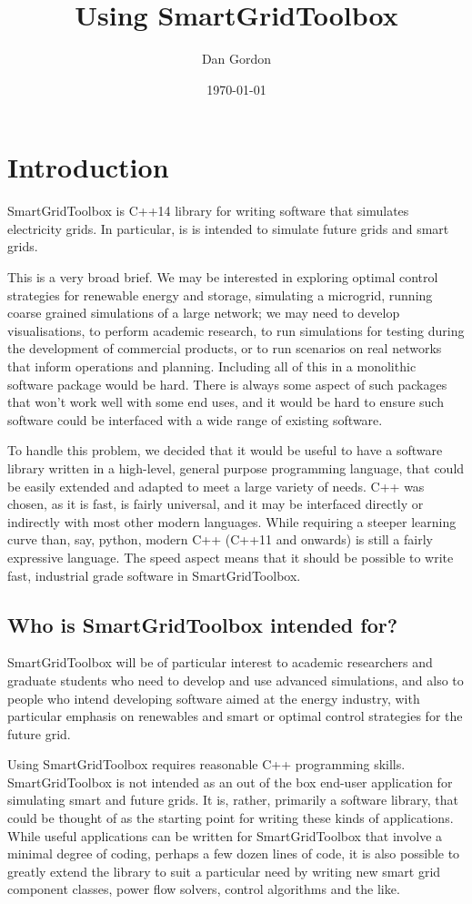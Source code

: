 \documentclass[10pt]{article}
\title{Using SmartGridToolbox}
\author{Dan Gordon}
\date{\today}
\begin{document}
\maketitle

\section{Introduction}
SmartGridToolbox is C++14 library for writing software that simulates electricity grids. In particular, is is intended to simulate future grids and smart grids.

This is a very broad brief. We may be interested in exploring optimal control strategies for renewable energy and storage, simulating a microgrid, running coarse grained simulations of a large network; we may need to develop visualisations, to perform academic research, to run simulations for testing during the development of commercial products, or to run scenarios on real networks that inform operations and planning. Including all of this in a monolithic software package would be hard. There is always some aspect of such packages that won't work well with some end uses, and it would be hard to ensure such software could be interfaced with a wide range of existing software.

To handle this problem, we decided that it would be useful to have a software library written in a high-level, general purpose programming language, that could be easily extended and adapted to meet a large variety of needs. C++ was chosen, as it is fast, is fairly universal, and it may be interfaced directly or indirectly with most other modern languages. While requiring a steeper learning curve than, say, python, modern C++ (C++11 and onwards) is still a fairly expressive language. The speed aspect means that it should be possible to write fast, industrial grade software in SmartGridToolbox.

\subsection{Who is SmartGridToolbox intended for?}
SmartGridToolbox will be of particular interest to academic researchers and graduate students who need to develop and use advanced simulations, and also to people who intend developing software aimed at the energy industry, with particular emphasis on renewables and smart or optimal control strategies for the future grid.

Using SmartGridToolbox requires reasonable C++ programming skills. SmartGridToolbox is not intended as an out of the box end-user application for simulating smart  and future grids. It is, rather, primarily a software library, that could be thought of as the starting point for writing these kinds of applications. While useful applications can be written for SmartGridToolbox that involve a minimal degree of coding, perhaps a few dozen lines of code, it is also possible to greatly extend the library to suit a particular need by writing new smart grid component classes, power flow solvers, control algorithms and the like.
\end{document}
